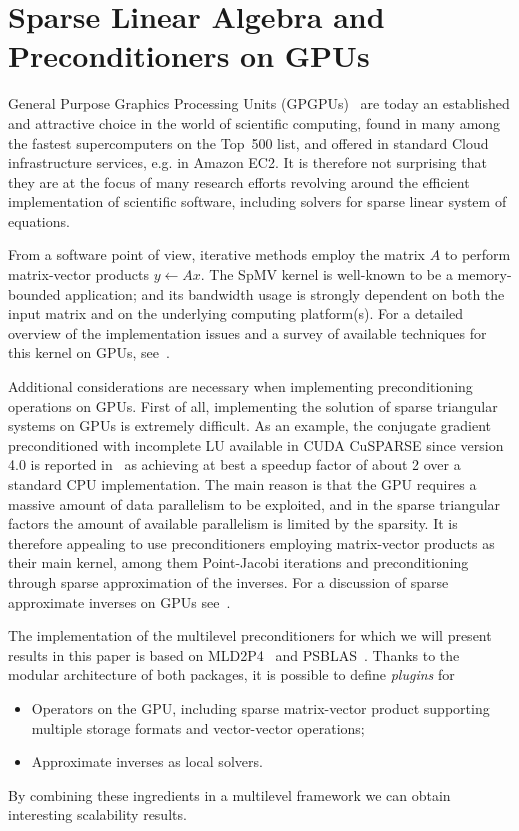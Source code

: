 \section{Sparse Linear Algebra and Preconditioners on GPUs}

General Purpose Graphics Processing Units (GPGPUs)~\cite{Luebke06}  
are today an established and attractive choice in the world of
scientific computing, found in many among the fastest supercomputers
on the Top~500 list, and offered in standard Cloud infrastructure
services, e.g. in  Amazon EC2. It is therefore not surprising that
they are at the focus of many research efforts revolving around the
efficient implementation of scientific software, including solvers for
sparse linear system of equations. 


From a  software point of view, iterative methods employ the matrix $A$ 
to perform matrix-vector products  $y\gets Ax$.
The SpMV kernel is well-known to be a memory-bounded application;
and  its bandwidth usage  is strongly dependent on both the input
matrix and on the underlying computing platform(s). For a detailed
overview of the implementation issues and a survey of available
techniques for this kernel on GPUs,
see~\cite{Filippone:2017:SMM:3034774.3017994}.    

Additional considerations are necessary when implementing
preconditioning operations on GPUs. First of all, implementing the
solution of sparse triangular systems on GPUs is extremely difficult.
As an example, the conjugate gradient preconditioned with incomplete
LU available in CUDA CuSPARSE since version 4.0 
is reported in~\cite{Naumov11} as achieving at best a speedup factor
of about 2 over a standard CPU implementation. The main reason is that
the GPU requires a massive amount of data parallelism to be exploited,
and in the sparse triangular factors the amount of available
parallelism is limited by the sparsity. It is therefore appealing to
use preconditioners employing matrix-vector products as their main
kernel, among them  Point-Jacobi iterations and preconditioning
through sparse approximation of the   inverses.
For a discussion of sparse approximate inverses on GPUs 
see~\cite{BERTACCINI2016693}. 

The implementation of the multilevel preconditioners for which we will
present results in this paper is based on MLD2P4~\cite{mld-toms} and
PSBLAS~\cite{psblas3}. Thanks to the modular architecture of both
packages, it is possible to define \emph{plugins} for 
\begin{itemize}
\item Operators on the GPU, including sparse matrix-vector product
  supporting multiple storage formats and vector-vector operations;
\item Approximate inverses as local solvers.
\end{itemize}
By combining these ingredients in a multilevel framework we can obtain
interesting scalability results. 

